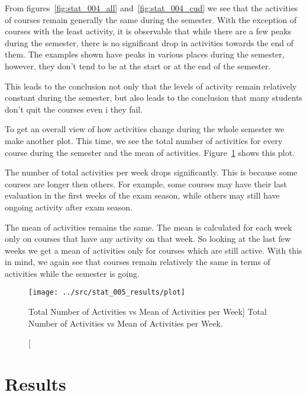 From figures~\ref{fig:stat_004_all} and~\ref{fig:stat_004_cud} we see that the
activities of courses remain generally the same during the semester. With the
exception of courses with the least activity, it is observable that while there
are a few peaks during the semester, there is no significant drop in activities
towards the end of them. The examples shown have peaks in various places during
the semester, however, they don't tend to be at the start or at the end of the
semester.

This leads to the conclusion not only that the levels of activity remain
relatively constant during the semester, but also leads to the conclusion that
many students don't quit the courses even i they fail.

To get an overall view of how activities change during the whole semester we
make another plot. This time, we see the total number of activities for every
course during the semester and the mean of activities.
Figure~\ref{fig:stat_005} shows this plot.

The number of total activities per week drops significantly. This is because
some courses are longer then others. For example, some courses may have their
last evaluation in the first weeks of the exam season, while others may still
have ongoing activity after exam season.


The mean of activities remains the same. The mean is calculated for each week
only on courses that have any activity on that week. So looking at the last few
weeks we get a mean of activities only for courses which are still active. With
this in mind, we again see that courses remain relatively the same in terms of
activities while the semester is going.

\begin{figure}[h!]
    \centering

    \texttt{[image: ../src/stat\_005\_results/plot]}

    \caption
        [Total Number of Activities vs Mean of Activities per Week]
        {Total Number of Activities vs Mean of Activities per Week.}

    \label{fig:stat_005}
\end{figure}

\section{Results}

